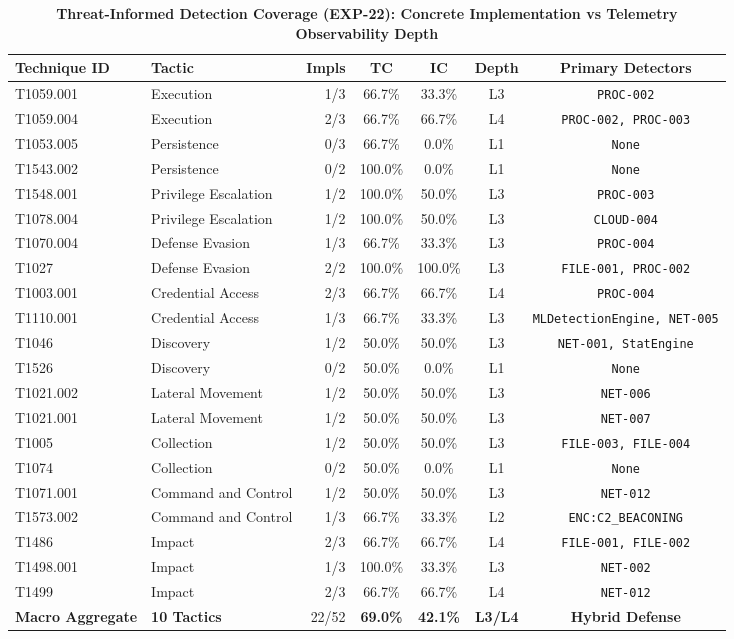 \begin{table}[t]
\centering
\small
\caption{\textbf{Threat-Informed Detection Coverage (EXP-22): Concrete Implementation vs Telemetry Observability Depth}}
\label{tab:threat_informed_coverage}
\begin{tabular}{llrcccc}
\toprule
\textbf{Technique ID} & \textbf{Tactic} & \textbf{Impls} & \textbf{TC} & \textbf{IC} & \textbf{Depth} & \textbf{Primary Detectors} \\
\midrule
T1059.001 & Execution & 1/3 & 66.7\% & 33.3\% & L3 & \texttt{PROC-002} \\
T1059.004 & Execution & 2/3 & 66.7\% & 66.7\% & L4 & \texttt{PROC-002, PROC-003} \\
T1053.005 & Persistence & 0/3 & 66.7\% & 0.0\% & L1 & \texttt{None} \\
T1543.002 & Persistence & 0/2 & 100.0\% & 0.0\% & L1 & \texttt{None} \\
T1548.001 & Privilege Escalation & 1/2 & 100.0\% & 50.0\% & L3 & \texttt{PROC-003} \\
T1078.004 & Privilege Escalation & 1/2 & 100.0\% & 50.0\% & L3 & \texttt{CLOUD-004} \\
T1070.004 & Defense Evasion & 1/3 & 66.7\% & 33.3\% & L3 & \texttt{PROC-004} \\
T1027 & Defense Evasion & 2/2 & 100.0\% & 100.0\% & L3 & \texttt{FILE-001, PROC-002} \\
T1003.001 & Credential Access & 2/3 & 66.7\% & 66.7\% & L4 & \texttt{PROC-004} \\
T1110.001 & Credential Access & 1/3 & 66.7\% & 33.3\% & L3 & \texttt{MLDetectionEngine, NET-005} \\
T1046 & Discovery & 1/2 & 50.0\% & 50.0\% & L3 & \texttt{NET-001, StatEngine} \\
T1526 & Discovery & 0/2 & 50.0\% & 0.0\% & L1 & \texttt{None} \\
T1021.002 & Lateral Movement & 1/2 & 50.0\% & 50.0\% & L3 & \texttt{NET-006} \\
T1021.001 & Lateral Movement & 1/2 & 50.0\% & 50.0\% & L3 & \texttt{NET-007} \\
T1005 & Collection & 1/2 & 50.0\% & 50.0\% & L3 & \texttt{FILE-003, FILE-004} \\
T1074 & Collection & 0/2 & 50.0\% & 0.0\% & L1 & \texttt{None} \\
T1071.001 & Command and Control & 1/2 & 50.0\% & 50.0\% & L3 & \texttt{NET-012} \\
T1573.002 & Command and Control & 1/3 & 66.7\% & 33.3\% & L2 & \texttt{ENC:C2_BEACONING} \\
T1486 & Impact & 2/3 & 66.7\% & 66.7\% & L4 & \texttt{FILE-001, FILE-002} \\
T1498.001 & Impact & 1/3 & 100.0\% & 33.3\% & L3 & \texttt{NET-002} \\
T1499 & Impact & 2/3 & 66.7\% & 66.7\% & L4 & \texttt{NET-012} \\
\midrule
\textbf{Macro Aggregate} & \textbf{10 Tactics} & 22/52 & \textbf{69.0\%} & \textbf{42.1\%} & \textbf{L3/L4} & \textbf{Hybrid Defense} \\
\bottomrule
\end{tabular}
\end{table}
